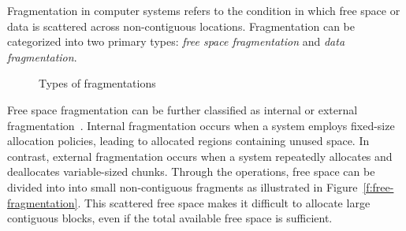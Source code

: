 \begin{comment}
Secondly, SSDs enhance read performance through prefetching, which loads subsequent data in advance based on LBA.
Fragmentation can cause this prefetching to load unnecessary data.\cite{Defragmentation_Log_write_is_ssd_to_bad} For these reasons, filesystem fragmentation is also a concern in SSDs.

\noindent {\textbf{Logical fragmentation and physical fragmentation.}}
I/O performance in flash storage is affected in different ways by logical fragmentation and physical fragmentation.\cite{janusd:atc17}
Logical fragmentation occurs when files are allocated in multiple fragmented storage spaces (extents) within the filesystem.
When a file is not stored contiguously and is spread across various locations, the filesystem recognizes this as being in a logically fragmented state.
As a result, more I/O requests are needed to read the file, which increases overhead in I/O scheduling and handshaking processes.

On the other hand, physical fragmentation happens when the data of a file is allocated non-contiguously at the physical locations of the storage device.
In flash storage, data can be distributed across multiple channels, which directly impacts I/O parallelism.
This can lead to a degradation in I/O performance.
Even if the Physical Block Address (PBA) is contiguous, if the Logical Block Address (LBA) is non-contiguous, separate I/O requests become necessary.
This increases the number of I/O requests, which can lower the overall performance of the system.
Therefore, logical fragmentation and physical fragmentation can occur independently, and appropriate measures are needed to address each issue.
\end{comment}

Fragmentation in computer systems refers to the condition in which free space or data is scattered across non-contiguous locations.
Fragmentation can be categorized into two primary types: \emph{free space fragmentation} and \emph{data fragmentation}.

\begin{figure*}[t]
\centering
	\caption{Types of fragmentations\label{f:fragmentation}}
\end{figure*}

Free space fragmentation can be further classified as internal or external fragmentation~\cite{osteps,os-textbook}.
Internal fragmentation occurs when a system employs fixed-size allocation policies, leading to allocated regions containing unused space.
In contrast, external fragmentation occurs when a system repeatedly allocates and deallocates variable-sized chunks.
Through the operations, free space can be divided into into small non-contiguous fragments as illustrated in Figure~\ref{f:free-fragmentation}.
This scattered free space makes it difficult to allocate large contiguous blocks, even if the total available free space is sufficient.

